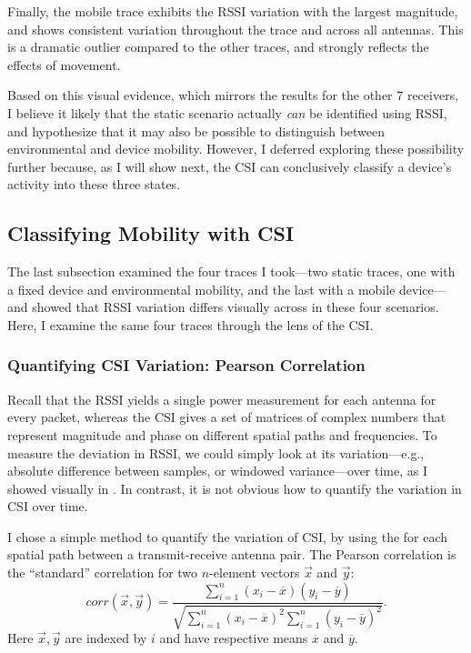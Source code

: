 Finally, the mobile trace exhibits the RSSI variation with the largest magnitude, and shows consistent variation throughout the trace and across all antennas. This is a dramatic outlier compared to the other traces, and strongly reflects the effects of movement.

Based on this visual evidence, which mirrors the results for the other 7 receivers, I believe it likely that the static scenario actually \emph{can} be identified using RSSI, and hypothesize that it may also be possible to distinguish between environmental and device mobility. However, I deferred exploring these possibility further because, as I will show next, the CSI can conclusively classify a device's activity into these three states.

\subsection{Classifying Mobility with CSI}
The last subsection examined the four traces I took---two static traces, one with a fixed device and environmental mobility, and the last with a mobile device---and showed that RSSI variation differs visually across in these four scenarios. Here, I examine the same four traces through the lens of the CSI.

\subsubsection{Quantifying CSI Variation: Pearson Correlation}
Recall that the RSSI yields a single power measurement for each antenna for every packet, whereas the CSI gives a set of matrices of complex numbers that represent magnitude and phase on different spatial paths and frequencies. To measure the deviation in RSSI, we could simply look at its variation---e.g., absolute difference between samples, or windowed variance---over time, as I showed visually in . In contrast, it is not obvious how to quantify the variation in CSI over time.

I chose a simple method to quantify the variation of CSI, by using the  for each spatial path between a transmit-receive antenna pair. The Pearson correlation is the ``standard'' correlation for two $n$-element vectors $\vec{x}$ and $\vec{y}$:
\begin{equation}
\textit{corr}(\vec{x},\vec{y}) = \frac{\sum_{i=1}^n(x_i-\overline{x})(y_i-\overline{y})}{\sqrt{\sum_{i=1}^n(x_i-\overline{x})^2 \sum_{i=1}^n(y_i-\overline{y})^2}}.
\end{equation}
Here $\vec{x},\vec{y}$ are indexed by $i$ and have respective means $\overline{x}$ and $\overline{y}$.

